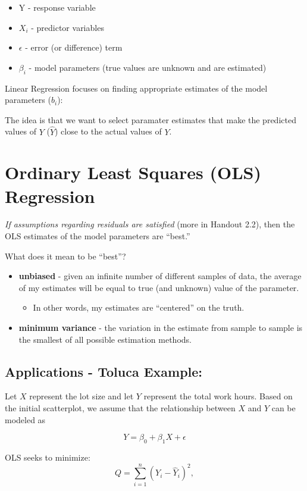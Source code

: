 \documentclass[12pt]{notes}
\begin{document}
\begin{itemize}
\item Y - response variable
\item $X_i$ - predictor variables
\item $\epsilon$ - error (or difference) term
\item $\beta_i$ - model parameters (true values are unknown and are estimated)
\end{itemize}

\nspace
Linear Regression focuses on finding appropriate estimates of the model parameters ($b_i$):

\nspace
The idea is that we want to select paramater estimates that make the predicted values of $Y$ ($\hat{Y}$) close to the actual values of $Y$.

\section{Ordinary Least Squares (OLS) Regression}
\textit{If assumptions regarding residuals are satisfied} (more in Handout 2.2), then the OLS estimates of the model parameters are ``best.''

\nspace
What does it mean to be ``best''?
\begin{itemize}
\item \textbf{unbiased} - given an infinite number of different samples of data, the average of my estimates will be equal to true (and unknown) value of the parameter. 
\begin{itemize}
\item In other words, my estimates are ``centered'' on the truth. 
\end{itemize}
\item \textbf{minimum variance} - the variation in the estimate from sample to sample is the smallest of all possible estimation methods. 
\end{itemize}

\subsection*{Applications - Toluca Example:} 
Let $X$ represent the lot size and let $Y$ represent the total work hours. Based on the initial scatterplot, we assume that the relationship between $X$ and $Y$ can be modeled as 

\[Y = \beta_0 + \beta_1X + \epsilon\]

\nspace
OLS seeks to minimize:
\[
Q = \sum_{i=1}^n\left(Y_i - \hat{Y}_i \right)^2,
\]
\end{document}
